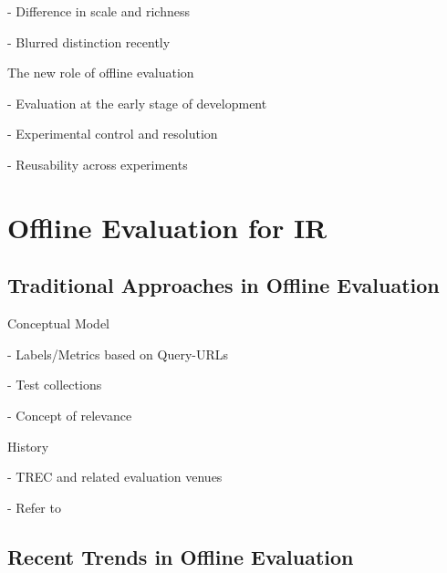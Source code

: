 \documentclass[openany]{now} %
\newcommand{\newpar}{\bigskip\noindent}
\begin{document}
- Difference in scale and richness

- Blurred distinction recently

\cite{Bron:2013}
\cite{Liu:2014}
\cite{Shah:2011}

\newpar
The new role of offline evaluation

- Evaluation at the early stage of development

- Experimental control and resolution

- Reusability across experiments

\section{Offline Evaluation for IR}
\subsection{Traditional Approaches in Offline Evaluation}

Conceptual Model

- Labels/Metrics based on Query-URLs

- Test collections 

- Concept of relevance 

\newpar
History

- TREC and related evaluation venues \cite{INR-009}

- Refer to \cite{borlund2003} \cite{cleverdon67} \cite{voor:trec05}

\subsection{Recent Trends in Offline Evaluation}



\end{document}
